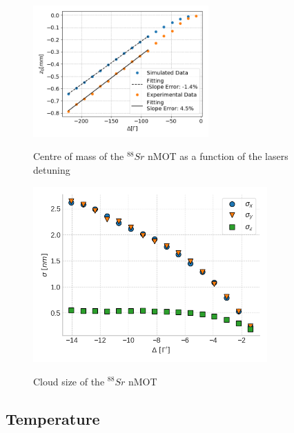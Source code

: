 \begin{figure}[!ht]
    \centering
    \caption{Centre of mass of the ${}^{88}Sr$ nMOT as a function of the lasers detuning}
    \includegraphics[width=0.6\textwidth]{USPSC-img/sr_centre_of_mass.png}
    \vspace{5px}
    \label{fig:sr-centre-of-mass}
\end{figure}

\begin{figure}[!ht]
    \centering
    \caption{Cloud size of the ${}^{88}Sr$ nMOT}
    \includegraphics[width=0.8\textwidth]{USPSC-img/sr_loftus_cloud_size.png}
    \vspace{5px}
    \label{fig:sr-loftus-cloud-size}
\end{figure}


\subsection{Temperature}
\label{temperature}


